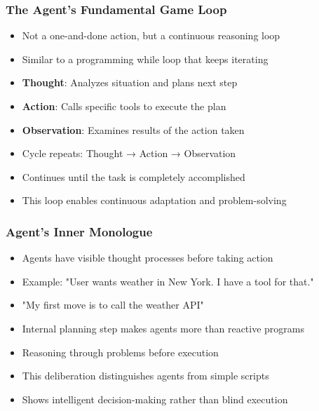 \begin{frame}[fragile]\frametitle{The Agent's Fundamental Game Loop}
      \begin{itemize}
        \item Not a one-and-done action, but a continuous reasoning loop
        \item Similar to a programming while loop that keeps iterating
        \item \textbf{Thought}: Analyzes situation and plans next step
        \item \textbf{Action}: Calls specific tools to execute the plan
        \item \textbf{Observation}: Examines results of the action taken
        \item Cycle repeats: Thought → Action → Observation
        \item Continues until the task is completely accomplished
        \item This loop enables continuous adaptation and problem-solving
      \end{itemize}
\end{frame}

\begin{frame}[fragile]\frametitle{Agent's Inner Monologue}
      \begin{itemize}
        \item Agents have visible thought processes before taking action
        \item Example: "User wants weather in New York. I have a tool for that."
        \item "My first move is to call the weather API"
        \item Internal planning step makes agents more than reactive programs
        \item Reasoning through problems before execution
        \item This deliberation distinguishes agents from simple scripts
        \item Shows intelligent decision-making rather than blind execution
      \end{itemize}
\end{frame}

